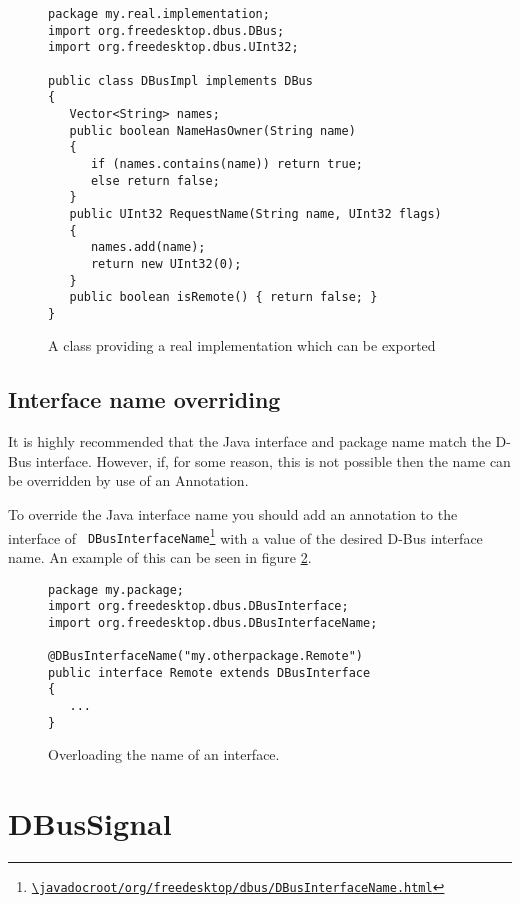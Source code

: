 \documentclass[a4paper,12pt]{article}
\begin{document}
\begin{figure}[htb]
\begin{center}
\begin{verbatim}
package my.real.implementation;
import org.freedesktop.dbus.DBus;
import org.freedesktop.dbus.UInt32;

public class DBusImpl implements DBus
{
   Vector<String> names;
   public boolean NameHasOwner(String name)
   {
      if (names.contains(name)) return true;
      else return false;
   }
   public UInt32 RequestName(String name, UInt32 flags)
   {
      names.add(name);
      return new UInt32(0);
   }
   public boolean isRemote() { return false; }
}
\end{verbatim}
\end{center}
\caption{A class providing a real implementation which can be exported}
\label{fig:class}
\end{figure}

\subsection{Interface name overriding}

It is highly recommended that the Java interface and package name match the
D-Bus interface. However, if, for some reason, this is not possible then the
name can be overridden by use of an Annotation.

To override the Java interface name you should add an annotation to the
interface of {\tt
DBusInterfaceName\footnote{\url{\javadocroot/org/freedesktop/dbus/DBusInterfaceName.html}}}
with a value of the desired D-Bus interface name. An example of this can be seen in
figure \ref{fig:interfacename}.

\begin{figure}[htb]
\begin{center}
\begin{verbatim}
package my.package;
import org.freedesktop.dbus.DBusInterface;
import org.freedesktop.dbus.DBusInterfaceName;

@DBusInterfaceName("my.otherpackage.Remote")
public interface Remote extends DBusInterface
{
   ...
}
\end{verbatim}
\end{center}
\caption{Overloading the name of an interface.}
\label{fig:interfacename}
\end{figure}

\section{DBusSignal}
\end{document}
